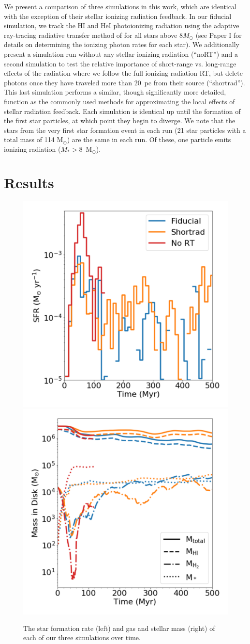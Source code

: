 \documentclass[twocolumn]{aastex62}
\begin{document}
We present a comparison of three simulations in this work, which are identical with the exception of their stellar ionizing radiation feedback. In our fiducial simulation, we track the HI and HeI photoionizing radiation using the adaptive ray-tracing radiative transfer method of \citep{WiseAbel2011} for all stars above 8$M_{\odot}$ (see Paper I for details on determining the ionizing photon rates for each star). We additionally present a simulation run without any stellar ionizing radiation (``noRT'') and a second simulation to test the relative importance of short-range vs. long-range effects of the radiation where we follow the full ionizing radiation RT, but delete photons once they have traveled more than 20~pc from their source (``shortrad''). This last simulation performs a similar, though significantly more detailed, function as the commonly used methods for approximating the local effects of stellar radiation feedback. Each simulation is identical up until the formation of the first star particles, at which point they begin to diverge. We note that the stars from the very first star formation event in each run (21 star particles with a total mass of 114 M$_{\odot}$) are the same in each run. Of these, one particle emits ionizing radiation ($M_* > 8 $~M$_{\odot}$). 

\section{Results} \label{sec:results}

\begin{figure}
\centering
\includegraphics[width=0.49\linewidth]{sfr}
\includegraphics[width=0.49\linewidth]{mass}
\caption{The star formation rate (left) and gas and stellar mass (right) of each of our three simulations over time.}
\label{fig:sfr_mass_evolution}
\end{figure}
\end{document}
